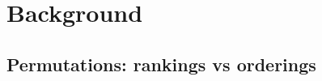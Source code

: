\documentclass[sigconf,dvipsnames]{acmart}
\begin{document}
%
%
%
%
%
%

\section{Background}\label{sec:backgroud}

\subsection{Permutations: rankings vs orderings}\label{sec:permutations}
\end{document}
